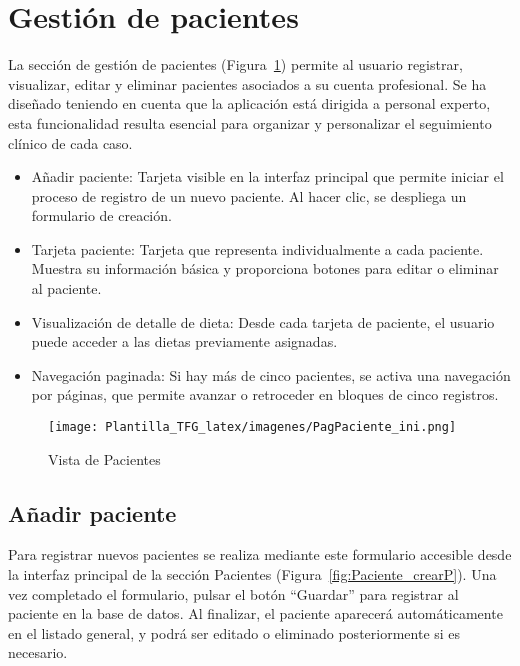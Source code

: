 \section{Gestión de pacientes}

La sección de gestión de pacientes (Figura~\ref{fig:PagPaciente_ini}) permite al usuario registrar, visualizar, editar y eliminar pacientes asociados a su cuenta profesional. Se ha diseñado teniendo en cuenta que la aplicación está dirigida a personal experto, esta funcionalidad resulta esencial para organizar y personalizar el seguimiento clínico de cada caso.

\begin{itemize}
    \item Añadir paciente: Tarjeta visible en la interfaz principal que permite iniciar el proceso de registro de un nuevo paciente. Al hacer clic, se despliega un formulario de creación.
    
    \item Tarjeta paciente: Tarjeta que representa individualmente a cada paciente. Muestra su información básica y proporciona botones para editar o eliminar al paciente.

    \item Visualización de detalle de dieta: Desde cada tarjeta de paciente, el usuario puede acceder a las dietas previamente asignadas. 
    
    \item Navegación paginada: Si hay más de cinco pacientes, se activa una navegación por páginas, que permite avanzar o retroceder en bloques de cinco registros.
\end{itemize}

\begin{figure}[H]
    \centering
    \texttt{[image: Plantilla\_TFG\_latex/imagenes/PagPaciente\_ini.png]}
    \caption{Vista de Pacientes}
    \label{fig:PagPaciente_ini}
\end{figure}

\subsection{Añadir paciente}
Para registrar nuevos pacientes se realiza mediante este formulario accesible desde la interfaz principal de la sección Pacientes (Figura~\ref{fig:Paciente_crearP}). Una vez completado el formulario, pulsar el botón ``Guardar'' para registrar al paciente en la base de datos. Al finalizar, el paciente aparecerá automáticamente en el listado general, y podrá ser editado o eliminado posteriormente si es necesario.

